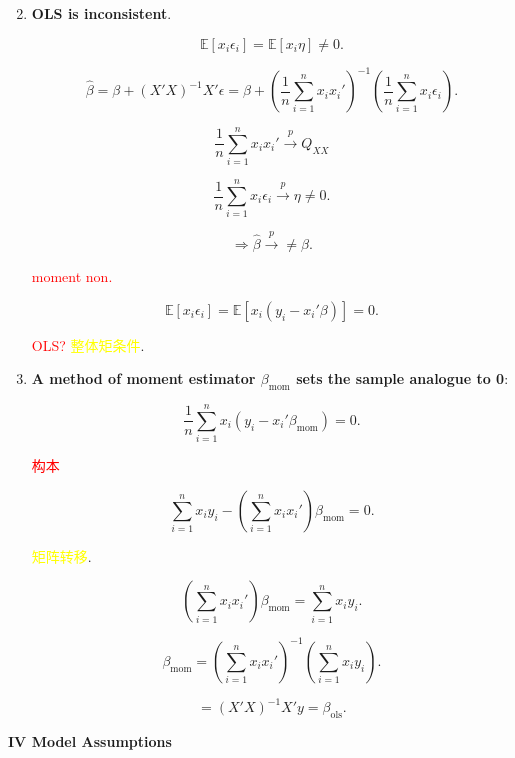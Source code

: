 \documentclass[12pt, oneside]{article}
\begin{document}
\begin{enumerate}
    \setcounter{enumi}{1}
    \item \textbf{OLS is inconsistent}.
    
    \[
    \mathbb{E}[x_i \epsilon_i] = \mathbb{E}[x_i \eta] \neq 0.
    \]
    
    \[
    \hat{\beta} = \beta + (X'X)^{-1} X' \epsilon = \beta + \left( \frac{1}{n} \sum_{i=1}^{n} x_i x_i' \right)^{-1} \left( \frac{1}{n} \sum_{i=1}^{n} x_i \epsilon_i \right).
    \]

    \[
    \frac{1}{n} \sum_{i=1}^{n} x_i x_i' \xrightarrow{p} Q_{XX}
    \]

    \[
    \frac{1}{n} \sum_{i=1}^{n} x_i \epsilon_i \xrightarrow{p} \eta \neq 0.
    \]

    \[
    \Rightarrow \hat{\beta} \xrightarrow{p} \neq \beta.
    \]

    \textcolor{red}{moment non.}

    \[
    \mathbb{E}[x_i \epsilon_i] = \mathbb{E}[x_i (y_i - x_i' \beta)] = 0.
    \]

    \textcolor{red}{OLS?} \textcolor{yellow}{整体矩条件}.

    \item \textbf{A method of moment estimator \( \beta_{\text{mom}} \) sets the sample analogue to 0}:

    \[
    \frac{1}{n} \sum_{i=1}^{n} x_i (y_i - x_i' \beta_{\text{mom}}) = 0.
    \]

    \textcolor{red}{构本}

    \[
    \sum_{i=1}^{n} x_i y_i - \left( \sum_{i=1}^{n} x_i x_i' \right) \beta_{\text{mom}} = 0.
    \]

    \textcolor{yellow}{矩阵转移}.

    \[
    \left( \sum_{i=1}^{n} x_i x_i' \right) \beta_{\text{mom}} = \sum_{i=1}^{n} x_i y_i.
    \]

    \[
    \beta_{\text{mom}} = \left( \sum_{i=1}^{n} x_i x_i' \right)^{-1} \left( \sum_{i=1}^{n} x_i y_i \right).
    \]

    \[
    = (X'X)^{-1} X' y = \beta_{\text{ols}}.
    \]
\end{enumerate}

\textbf{IV Model Assumptions}
\end{document}
